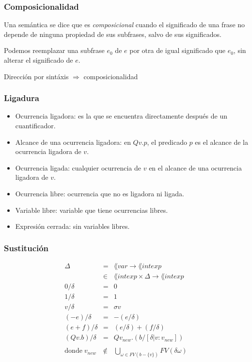   \subsubsection*{Composicionalidad}
    \PN Una semántica se dice que es \textit{composicional} cuando el significado de una frase no depende de ninguna propiedad de sus subfrases, salvo de sus significados.

    \PN Podemos reemplazar una subfrase $e_0$ de $e$ por otra de igual significado que $e_0$, sin alterar el significado de $e$.

  \vspace{5mm}
  \PN Dirección por sintáxis $\Rightarrow$ composicionalidad

  \subsubsection*{Ligadura}
    \begin{itemize}
      \item Ocurrencia ligadora: es la que se encuentra directamente después de un cuantificador.
      \item Alcance de una ocurrencia ligadora: en $Qv.p$, el predicado $p$ es el alcance de la ocurrencia ligadora de $v$.
      \item Ocurrencia ligada: cualquier ocurrencia de $v$ en el alcance de una ocurrencia ligadora de $v$.
      \item Ocurrencia libre: ocurrencia que no es ligadora ni ligada.
      \item Variable libre: variable que tiene ocurrencias libres.
      \item Expresión cerrada: sin variables libres.
    \end{itemize}

  \subsubsection*{Sustitución}
    \begin{eqnarray*}
      \Delta &=& \lang{var} \rightarrow \lang{intexp} \\
      &\in& \lang{intexp} \times \Delta \rightarrow \lang{intexp} \\
      0/\delta &=& 0 \\
      1/\delta &=& 1 \\
      v/\delta &=& \sigma v \\
      (-e)/\delta &=& -(e/\delta) \\
      (e+f)/\delta &=& (e/\delta) + (f/\delta) \\
      (Qv.b)/\delta &=& Qv_{new}.(b/[\delta|v:v_{new}]) \\ \\
      \text{donde} \; v_{new} &\notin& \bigcup_{\omega \in FV(b-\{v\})} FV(\delta \omega)
    \end{eqnarray*}
    
